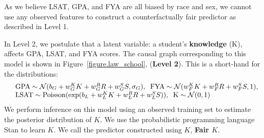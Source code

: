As we believe LSAT, GPA, and FYA are all biased by race and sex, we
cannot use any observed features to construct a counterfactually fair
predictor as described in Level 1. %

In Level 2, we postulate that a latent variable: a student's
\textbf{knowledge} (K), affects GPA, LSAT, and FYA scores. The causal
graph corresponding to this model is shown in
Figure~\ref{figure.law_school}, (\textbf{Level 2}). This is a
short-hand for the distributions:
\[
\begin{array}{ll}
  &\mbox{GPA} \sim {\cal N}(b_{G} + w_{G}^K K + w_{G}^R R + w_{G}^S S, \sigma_{G}),
  \;\;\mbox{FYA} \sim {\cal N}(w_{F}^K K + w_{F}^R R + w_{F}^S S, 1),\\
  &\mbox{LSAT} \sim \textrm{Poisson}(\exp(b_{L} + w_{L}^K K + w_{L}^R R + w_{L}^S S)), 
  \;\;\mbox{K} \sim {\cal N}(0,1)
\end{array}
\]
We perform inference on this model using an observed training set to
estimate the posterior distribution of $K$. We use the probabilistic
programming language Stan \cite{rstan} to learn $K$. We call the
predictor constructed using $K$, \textbf{Fair $K$}.


